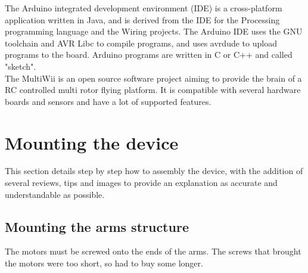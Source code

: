 \documentclass[12pt, a4paper,twoside]{tesi_upf}
\begin{document}
The Arduino integrated development environment (IDE) is a cross-platform application written in Java, and is derived from the IDE for the Processing programming language and the Wiring projects. The Arduino IDE uses the GNU toolchain and AVR Libc to compile programs, and uses avrdude to upload programs to the board. Arduino programs are written in C or C++ and called "sketch". 
\\[12pt]

The MultiWii is an open source software project aiming to provide the brain of a RC controlled multi rotor flying platform. It is compatible with several hardware boards and sensors and have a lot of supported features.
\\[12pt]

\chapter{Mounting the device}

This section details step by step how to assembly the device, with the addition of several reviews, tips and images to provide an explanation as accurate and understandable as possible.

\section{Mounting the arms structure}

The motors must be screwed onto the ends of the arms. The screws that brought the motors were too short, so had to buy some longer.

\noindent%
\begin{minipage}{\linewidth}
\vspace{10 mm}
\label{screwDifferences}
\end{minipage}    
\clearpage
\end{document}
